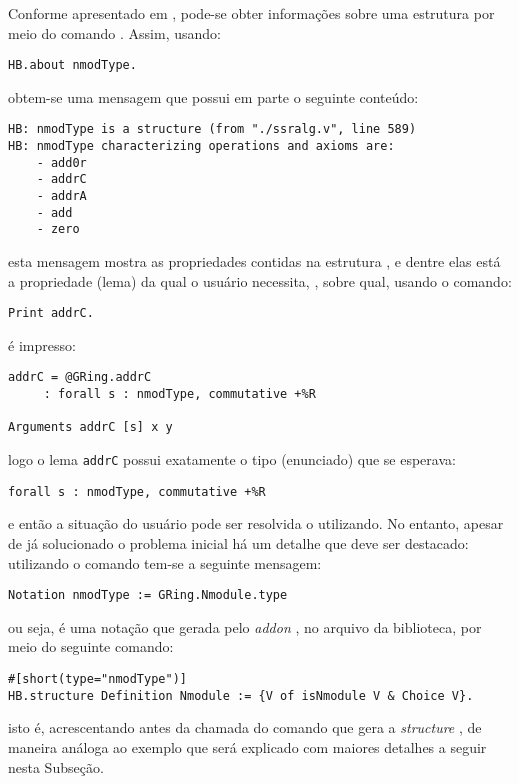 {{Conforme apresentado em \cite{mathcomp-contributing}, pode-se obter informações sobre uma estrutura por meio do comando . Assim, usando:
    \begin{lstlisting}[language=coq,frame=single,tabsize=1]
HB.about nmodType.
    \end{lstlisting}
obtem-se uma mensagem que possui em parte o seguinte conteúdo:
    \begin{lstlisting}[language=coq-error,frame=single,tabsize=1]
HB: nmodType is a structure (from "./ssralg.v", line 589)
HB: nmodType characterizing operations and axioms are:
    - add0r
    - addrC
    - addrA
    - add
    - zero
    \end{lstlisting}
esta mensagem mostra as propriedades contidas na estrutura , e dentre elas está a propriedade (lema) da qual o usuário necessita, , sobre qual, usando o comando:
    \begin{lstlisting}[language=coq,frame=single,tabsize=1]
Print addrC.
    \end{lstlisting}
é impresso:
    \begin{lstlisting}[language=coq-error,frame=single,tabsize=1]
addrC = @GRing.addrC
     : forall s : nmodType, commutative +%R

Arguments addrC [s] x y
    \end{lstlisting}
logo o lema \lstinline[language = coq]!addrC! possui exatamente o tipo (enunciado) que se esperava:
    \begin{lstlisting}[language=coq,frame=single,tabsize=1]
forall s : nmodType, commutative +%R
    \end{lstlisting}
e então a situação do usuário pode ser resolvida o utilizando.
No entanto, apesar de já solucionado o problema inicial há um detalhe que deve ser destacado: utilizando o comando  tem-se a seguinte mensagem:
    \begin{lstlisting}[language=coq-error,frame=single,tabsize=1]
Notation nmodType := GRing.Nmodule.type
    \end{lstlisting}
ou seja,  é uma notação que gerada pelo \textit{addon} , no arquivo \cite{math} da biblioteca, por meio do seguinte comando:
    \begin{lstlisting}[language=coq, frame=single, tabsize=1]
#[short(type="nmodType")]
HB.structure Definition Nmodule := {V of isNmodule V & Choice V}.
    \end{lstlisting}
isto é, acrescentando \coqinline[]{#[short(type="nmodType")]} antes da chamada do comando  que gera a \textit{structure} , de maneira análoga ao exemplo que será explicado com maiores detalhes a seguir nesta Subseção.

}}
